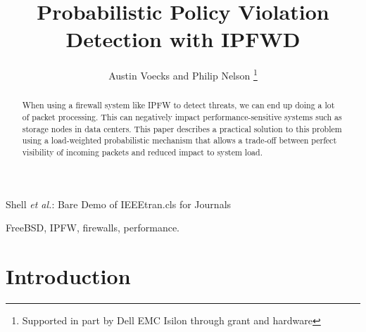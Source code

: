 \documentclass[journal]{IEEEtran}
\begin{document}
%
\title{Probabilistic Policy Violation Detection with IPFWD}

\author{Austin Voecks and Philip Nelson%
\thanks{Supported in part by Dell EMC Isilon through grant and hardware}}


%
{Shell \MakeLowercase{\textit{et al.}}: Bare Demo of IEEEtran.cls for Journals}
% 

\maketitle


\begin{abstract}
When using a firewall system like IPFW to detect threats, we can end up doing a
lot of packet processing. This can negatively impact performance-sensitive
systems such as storage nodes in data centers. This paper describes a
practical solution to this problem using a load-weighted probabilistic
mechanism that allows a trade-off between perfect visibility of incoming
packets and reduced impact to system load.  

\end{abstract}


\begin{IEEEkeywords}
FreeBSD, IPFW, firewalls, performance.
\end{IEEEkeywords}


%
\IEEEpeerreviewmaketitle


\section{Introduction}
\end{document}
